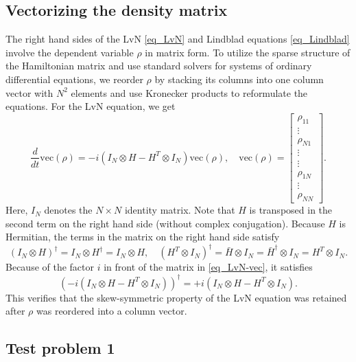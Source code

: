 \documentclass[11pt]{article}
\begin{document}
\subsection{Vectorizing the density matrix}

The right hand sides of the LvN \eqref{eq_LvN} and Lindblad equations \eqref{eq_Lindblad} involve
the dependent variable $\rho$ in matrix form. To utilize the sparse structure of the
Hamiltonian matrix and use standard solvers for systems of ordinary differential equations, we
reorder $\rho$ by stacking its columns into one column vector with $N^2$ elements and use Kronecker
products to reformulate the equations. For the LvN equation, we get
\begin{equation}\label{eq_LvN-vec}
%
\frac{d}{dt}\mbox{vec$(\rho)$} = -i\left( I_N\otimes H - H^T \otimes I_N \right)\mbox{vec$(\rho)$},\quad
%
\mbox{vec$(\rho)$} =
\begin{bmatrix}
  \rho_{11}\\
  \vdots \\
  \rho_{N1} \\
  \vdots\\
  \vdots\\
  \rho_{1N} \\
  \vdots \\
  \rho_{NN}
\end{bmatrix}.
\end{equation}
Here, $I_N$ denotes the $N\times N$ identity matrix. Note that $H$ is transposed in the second term
on the right hand side (without complex conjugation). Because $H$ is Hermitian, the terms in the
matrix on the right hand side satisfy
\[
( I_N\otimes H )^\dag = I_N \otimes H^\dag = I_N \otimes H,\quad
%
(H^T \otimes I_N)^\dag = \bar{H} \otimes I_N = \bar{H}^\dag \otimes I_N = H^T \otimes I_N.
\]
Because of the factor $i$ in front of the matrix in \eqref{eq_LvN-vec}, it satisfies
\[
\left( -i\left( I_N\otimes H - H^T \otimes I_N \right) \right)^\dag = +i\left( I_N\otimes H - H^T \otimes I_N \right).
\]
This verifies that the skew-symmetric property of the LvN equation was retained after $\rho$ was
reordered into a column vector.

\subsection{Test problem 1}
\end{document}

